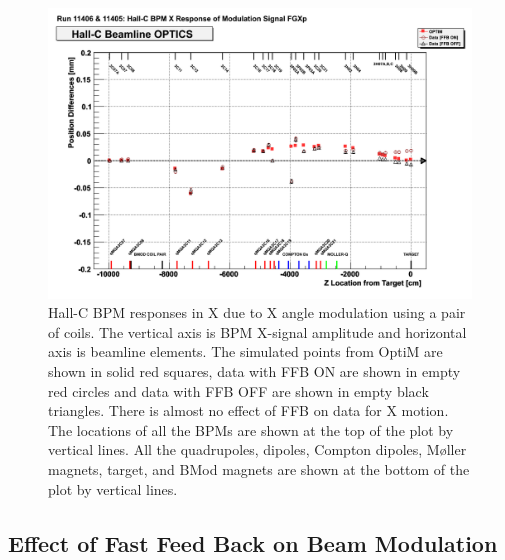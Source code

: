 \begin{singlespace}
\begin{figure}[!h]
	\begin{center}
	\includegraphics[width=15.0cm]{figures/BModOpticsFFBXXp}
	\end{center}
	\caption
	{Hall-C BPM responses in X due to X angle modulation using a pair of coils. The vertical axis is BPM X-signal amplitude and horizontal axis is beamline elements. The simulated points from OptiM are shown in solid red squares, data with FFB ON are shown in empty red circles and data with FFB OFF are shown in empty black triangles. There is almost no effect of FFB on data for X motion. The locations of all the BPMs are shown at the top of the plot by vertical lines. All the quadrupoles, dipoles, Compton dipoles, M{\o}ller magnets, target, and BMod magnets are shown at the bottom of the plot by vertical lines. }
	\label{fig:BModOpticsFFBXXp}
\end{figure}
\end{singlespace}

\subsection{Effect of Fast Feed Back on Beam Modulation}
\label{Effect of Fast Feed Back on Beam Modulation}


